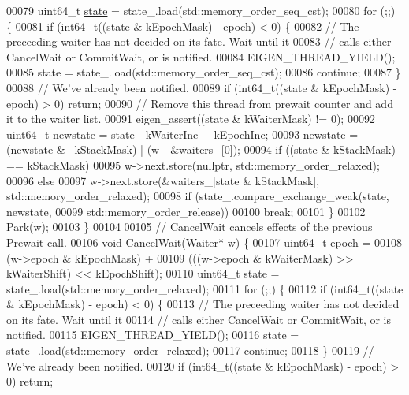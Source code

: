 \begin{DoxyCode}
{00079     uint64\_t \hyperlink{structstate}{state} = state\_.load(std::memory\_order\_seq\_cst);
00080     \textcolor{keywordflow}{for} (;;) \{
00081       \textcolor{keywordflow}{if} (int64\_t((state & kEpochMask) - epoch) < 0) \{
00082         \textcolor{comment}{// The preceeding waiter has not decided on its fate. Wait until it}
00083         \textcolor{comment}{// calls either CancelWait or CommitWait, or is notified.}
00084         EIGEN\_THREAD\_YIELD();
00085         state = state\_.load(std::memory\_order\_seq\_cst);
00086         \textcolor{keywordflow}{continue};
00087       \}
00088       \textcolor{comment}{// We've already been notified.}
00089       \textcolor{keywordflow}{if} (int64\_t((state & kEpochMask) - epoch) > 0) \textcolor{keywordflow}{return};
00090       \textcolor{comment}{// Remove this thread from prewait counter and add it to the waiter list.}
00091       eigen\_assert((state & kWaiterMask) != 0);
00092       uint64\_t newstate = state - kWaiterInc + kEpochInc;
00093       newstate = (newstate & ~kStackMask) | (w - &waiters\_[0]);
00094       \textcolor{keywordflow}{if} ((state & kStackMask) == kStackMask)
00095         w->next.store(\textcolor{keyword}{nullptr}, std::memory\_order\_relaxed);
00096       \textcolor{keywordflow}{else}
00097         w->next.store(&waiters\_[state & kStackMask], std::memory\_order\_relaxed);
00098       \textcolor{keywordflow}{if} (state\_.compare\_exchange\_weak(state, newstate,
00099                                        std::memory\_order\_release))
00100         \textcolor{keywordflow}{break};
00101     \}
00102     Park(w);
00103   \}
00104 
00105   \textcolor{comment}{// CancelWait cancels effects of the previous Prewait call.}
00106   \textcolor{keywordtype}{void} CancelWait(Waiter* w) \{
00107     uint64\_t epoch =
00108         (w->epoch & kEpochMask) +
00109         (((w->epoch & kWaiterMask) >> kWaiterShift) << kEpochShift);
00110     uint64\_t state = state\_.load(std::memory\_order\_relaxed);
00111     \textcolor{keywordflow}{for} (;;) \{
00112       \textcolor{keywordflow}{if} (int64\_t((state & kEpochMask) - epoch) < 0) \{
00113         \textcolor{comment}{// The preceeding waiter has not decided on its fate. Wait until it}
00114         \textcolor{comment}{// calls either CancelWait or CommitWait, or is notified.}
00115         EIGEN\_THREAD\_YIELD();
00116         state = state\_.load(std::memory\_order\_relaxed);
00117         \textcolor{keywordflow}{continue};
00118       \}
00119       \textcolor{comment}{// We've already been notified.}
00120       \textcolor{keywordflow}{if} (int64\_t((state & kEpochMask) - epoch) > 0) \textcolor{keywordflow}{return};
}
\end{DoxyCode}
